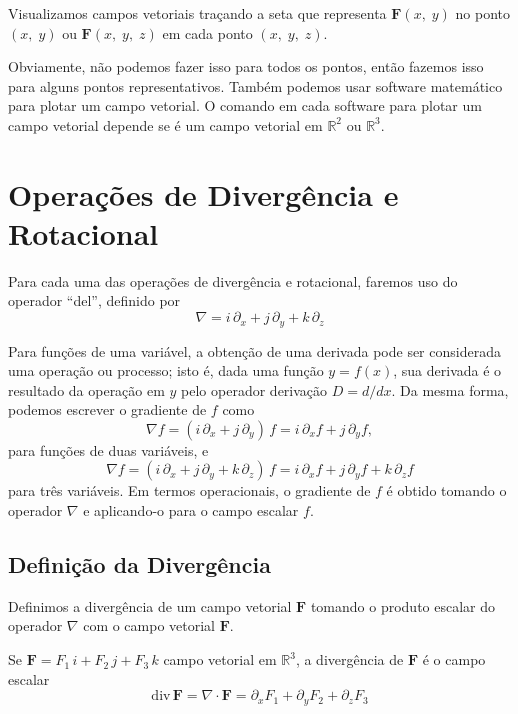 Visualizamos campos vetoriais traçando a seta que representa $\mathbf{F}(x,\; y)$ no ponto $(x,\; y)$ ou $\mathbf{F}(x,\; y,\; z)$ em cada ponto
$(x,\; y,\; z)$.

Obviamente, não podemos fazer isso para todos os pontos, então fazemos isso para alguns pontos representativos. Também podemos usar software
matemático para plotar um campo vetorial. O comando em cada software para plotar um campo vetorial depende se é um campo vetorial em $\mathbb{R}^{2}$
ou $\mathbb{R}^{3}$.

%
\section{Operações de Divergência e Rotacional}
%

Para cada uma das operações de divergência e rotacional, faremos uso do operador ``del'', definido por
\begin{equation*}
	\nabla = i\, \partial_{x}+j\, \partial_{y}+k\, \partial_{z}
\end{equation*}

Para funções de uma variável, a obtenção de uma derivada pode ser considerada uma operação ou processo; isto é, dada uma função \(y = f (x)\), sua derivada é o resultado da operação em \(y\) pelo operador derivação \(D=d/dx\). Da mesma forma, podemos escrever o gradiente de \(f\) como
\begin{equation*}
	\nabla f =\left(i\, \partial_{x}+j\, \partial_{y}\right)\, f = i\, \partial_{x} f+j\, \partial_{y} f,
\end{equation*}
para funções de duas variáveis, e
\begin{equation*}
	\nabla f =\left( i\, \partial_{x}+j\, \partial_{y}+k\, \partial_{z}\right)\, f= i\, \partial_{x} f+j\, \partial_{y}f+k\, \partial_{z} f
\end{equation*}
para três variáveis. Em termos operacionais, \textsf{o gradiente de} \(f\) é obtido tomando o operador \(\nabla\) e aplicando-o para o \textsf{campo
	escalar} \(f\).

%
\subsection*{Definição da Divergência}
%

Definimos a divergência de um campo vetorial \(\mathbf{F}\) tomando o produto escalar do operador  \(\nabla\) com o campo vetorial \(\mathbf{F}\).

\begin{defi}[Divergência]
	Se \(\mathbf{F} =F_{1}\, i + F_{2}\, j + F_{3}\, k\) campo vetorial em $\mathbb{R}^{3}$, a divergência de \( \mathbf{F}\) é o campo escalar
	\begin{equation*}
		\mathrm{div}\, \mathbf{F}= \nabla\cdot \mathbf{F} = \partial_{x}F_{1}+ \partial_{y}F_{2}+\partial_{z}F_{3}
	\end{equation*}
\end{defi}

